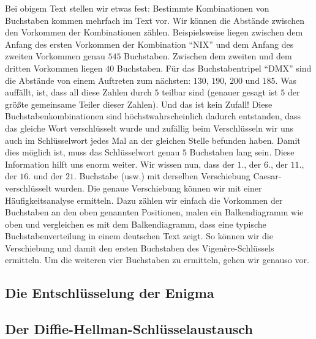 \documentclass[a4paper,ngerman,12pt]{scrartcl}
\theoremstyle{definition}
\begin{document}
Bei obigem Text stellen wir etwas fest: Bestimmte Kombinationen von Buchstaben kommen mehrfach im Text vor. Wir können die Abstände zwischen den Vorkommen der Kombinationen zählen. Beispielsweise liegen zwischen dem Anfang des ersten Vorkommen der Kombination "`NIX"' und dem Anfang des zweiten Vorkommen genau $545$ Buchstaben. Zwischen dem zweiten und dem dritten Vorkommen liegen $40$ Buchstaben. Für das Buchstabentripel "`DMX"' sind die Abstände von einem Auftreten zum nächsten: $130$, $190$, $200$ und $185$. Was auffällt, ist, dass all diese Zahlen durch $5$ teilbar sind (genauer gesagt ist $5$ der größte gemeinsame Teiler dieser Zahlen). Und das ist kein Zufall! Diese Buchstabenkombinationen sind höchstwahrscheinlich dadurch entstanden, dass das gleiche Wort verschlüsselt wurde und zufällig beim Verschlüsseln wir uns auch im Schlüsselwort jedes Mal an der gleichen Stelle befunden haben. Damit dies möglich ist, muss das Schlüsselwort genau $5$ Buchstaben lang sein. Diese Information hilft uns enorm weiter. Wir wissen nun, dass der $1$., der $6$., der $11$., der $16$. und der $21$. Buchstabe (usw.) mit derselben Verschiebung Caesar-verschlüsselt wurden. Die genaue Verschiebung können wir mit einer Häufigkeitsanalyse ermitteln. Dazu zählen wir einfach die Vorkommen der Buchstaben an den oben genannten Positionen, malen ein Balkendiagramm wie oben und vergleichen es mit dem Balkendiagramm, dass eine typische Buchstabenverteilung in einem deutschen Text zeigt. So können wir die Verschiebung und damit den ersten Buchstaben des Vigenère-Schlüssels ermitteln. Um die weiteren vier Buchstaben zu ermitteln, gehen wir genauso vor.

\subsection{Die Entschlüsselung der Enigma}


\subsection{Der Diffie-Hellman-Schlüsselaustausch}


\end{document}
